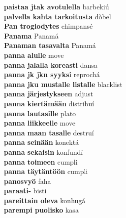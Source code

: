 \textbf{ paistaa jtak avotulella  } barbekiú \\
\textbf{ palvella kahta tarkoitusta  } dòbel \\
\textbf{ Pan troglodytes  } chimpansé \\
\textbf{ Panama  } Panamá \\
\textbf{ Panaman tasavalta  } Panamá \\
\textbf{ panna alulle  } move \\
\textbf{ panna jalalla koreasti  } dansa \\
\textbf{ panna jk jkn syyksi  } reprochá \\
\textbf{ panna jku mustalle listalle  } blacklist \\
\textbf{ panna järjestykseen  } adjust \\
\textbf{ panna kiertämään  } distribuí \\
\textbf{ panna lautasille  } plato \\
\textbf{ panna liikkeelle  } move \\
\textbf{ panna maan tasalle  } destruí \\
\textbf{ panna seinään  } konektá \\
\textbf{ panna sekaisin  } konfundí \\
\textbf{ panna toimeen  } cumpli \\
\textbf{ panna täytäntöön  } cumpli \\
\textbf{ panosvyö  } faha \\
\textbf{ paraati-  } bisti \\
\textbf{ pareittain oleva  } konhugá \\
\textbf{ parempi puolisko  } kasa \\
